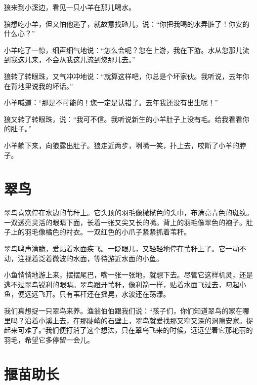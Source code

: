 \documentclass[12pt,UTF-8,openany]{ctexbook}
\begin{document}
\begin{large}
    
    狼来到小溪边，看见一只小羊在那儿喝水。
    
    狼想吃小羊，但又怕他逃了，就故意找碴儿，说：“你把我喝的水弄脏了！你安的什么心？”
    
    小羊吃了一惊，细声细气地说：“怎么会呢？您在上游，我在下游。水从您那儿流到我这儿来，不会从我这儿流到您那儿去。”
    
    狼转了转眼珠，又气冲冲地说：“就算这样吧，你总是个坏家伙。我听说，去年你在背地里说我的坏话。”
    
    小羊喊道：“那是不可能的！您一定是认错了。去年我还没有出生呢！”
    
    狼又转了转眼珠，说：“我可不信。我听说新生的小羊肚子上没有毛。给我看看你的肚子。”
    
    小羊躺下来，向狼露出肚子。狼走近两步，咧嘴一笑，扑上去，咬断了小羊的脖子。
    
\end{large}



\chapter{翠鸟}

\begin{large}
    
    翠鸟喜欢停在水边的苇秆上。它头顶的羽毛像橄榄色的头巾，布满亮青色的斑纹。一双透亮灵活的眼睛下面，长着一张又尖又长的嘴。背上的羽毛像翠色的袍子。肚子上的羽毛像橘色的衬衣。一双红色的小爪子紧紧抓着苇秆。
    
    翠鸟鸣声清脆，爱贴着水面疾飞。一眨眼儿，又轻轻地停在苇秆上了。它一动不动，注视着泛着微波的水面，等待游近水面的小鱼。
    
    小鱼悄悄地游上来，摆摆尾巴，嘴一张一张地，就想下去。尽管它这样机灵，还是逃不过翠鸟锐利的眼睛。翠鸟蹬开苇秆，像利箭一样，贴着水面飞过去，叼起小鱼，便远远飞开。只有苇秆还在摇晃，水波还在荡漾。
    
    我们真想捉一只翠鸟来养。渔翁伯伯跟我们说：“孩子们，你们知道翠鸟的家在哪里吗？沿着小溪上去，在那陡峭的石壁上，翠鸟就爱找那又窄又深的洞隙安家。捉起来可难了。”我们便打消了这个想法，只在翠鸟飞来的时候，远远望着它那艳丽的羽毛，希望它多停留一会儿。
    
\end{large}



\chapter{揠苗助长}
\end{document}
